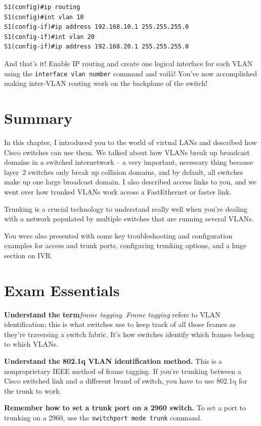 \begin{verbatim}
S1(config)#ip routing
S1(config)#int vlan 10
S1(config-if)#ip address 192.168.10.1 255.255.255.0
S1(config-if)#int vlan 20
S1(config-if)#ip address 192.168.20.1 255.255.255.0
\end{verbatim}

And that's it! Enable IP routing and create one logical interface for
each VLAN using the \texttt{interface\ vlan\ number} command and voilà!
You've now accomplished making inter-VLAN routing work on the backplane
of the switch!

\section{Summary}

In this chapter, I introduced you to the world of virtual LANs and
described how Cisco switches can use them. We talked about how VLANs
break up broadcast domains in a switched internetwork -- a very
important, necessary thing because layer~2 switches only break up
collision domains, and by default, all switches make up one large
broadcast domain. I also described access links to you, and we went over
how trunked VLANs work across a FastEthernet or faster link.

Trunking is a crucial technology to understand really well when you're
dealing with a network populated by multiple switches that are running
several VLANs.

You were also presented with some key troubleshooting and configuration
examples for access and trunk ports, configuring trunking options, and a
huge section on IVR.

\section{Exam Essentials}

\textbf{Understand the term}\emph{frame tagging}. \emph{Frame tagging}
refers to VLAN identification; this is what switches use to keep track
of all those frames as they're traversing a switch fabric. It's how
switches identify which frames belong to which VLANs.

\textbf{Understand the 802.1q VLAN identification method.} This is a
nonproprietary IEEE method of frame tagging. If you're trunking between
a Cisco switched link and a different brand of switch, you have to use
802.1q for the trunk to work.

\textbf{Remember how to set a trunk port on a 2960 switch.} To set a
port to trunking on a 2960, use the \texttt{switchport\ mode\ trunk}
command.

